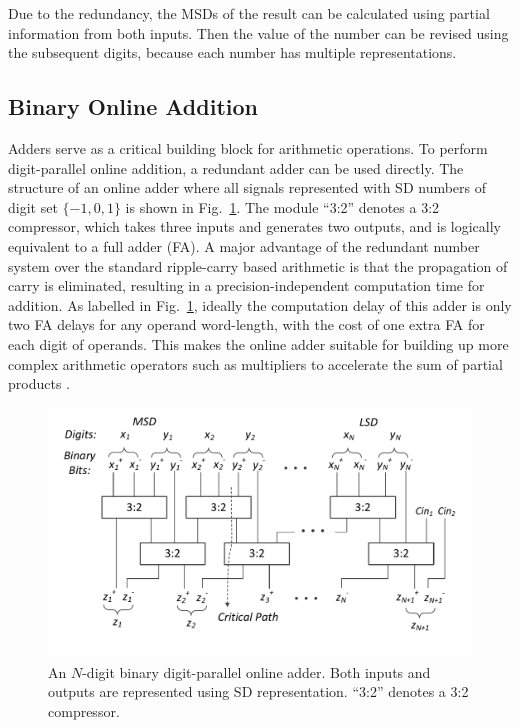 \documentclass[conference]{IEEEtran}
\begin{document}
Due to the redundancy, the MSDs of the result can be calculated using partial information from both inputs. Then the value of the number can be revised using the subsequent digits, because each number has multiple representations.

\subsection{Binary Online Addition}
Adders serve as a critical building block for arithmetic operations. To perform digit-parallel online addition, a redundant adder can be used directly. The structure of an online adder where all signals represented with SD numbers of digit set $\{-1,0,1\}$ is shown in Fig.~\ref{Fig:Radix2SD_adder}. The module ``3:2'' denotes a 3:2 compressor, which takes three inputs and generates two outputs, and is logically equivalent to a full adder (FA). A major advantage of the redundant number system over the standard ripple-carry based arithmetic is that the propagation of carry is eliminated, resulting in a precision-independent computation time for addition. As labelled in Fig.~\ref{Fig:Radix2SD_adder}, ideally the computation delay of this adder is only two FA delays for any operand word-length, with the cost of one extra FA for each digit of operands. This makes the online adder suitable for building up more complex arithmetic operators such as multipliers to accelerate the sum of partial products \cite{RedundantMult_1987}.

\begin{figure}[tbp]
	\centering
	\includegraphics[width=.5\textwidth]{./Figures/SDAdder2.pdf}
    \vspace{-6ex}
	\caption{An $N$-digit binary digit-parallel online adder. Both inputs and outputs are represented using SD representation. ``3:2'' denotes a 3:2 compressor.}
    \vspace{2ex}
	\label{Fig:Radix2SD_adder}
\end{figure}

\end{document}
